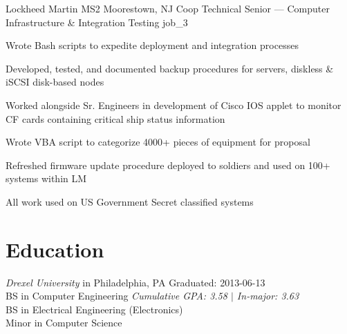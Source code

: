\documentclass[10pt]{barag_resume}
\begin{document}
    \begin{job}{Lockheed Martin MS2}
        {Moorestown, NJ}
        {Coop Technical Senior --- Computer Infrastructure \& Integration Testing}
        {job_3}
            \item Wrote Bash scripts to expedite deployment and integration processes
            \item Developed, tested, and documented backup procedures for servers, diskless \& iSCSI disk-based nodes
            \item Worked alongside Sr. Engineers in development of Cisco IOS applet to monitor CF cards containing critical ship status information
            \item Wrote VBA script to categorize 4000+ pieces of equipment for proposal
            \item Refreshed firmware update procedure deployed to soldiers and used on 100+ systems within LM
            \item All work used on US Government Secret classified systems
    \end{job}


\section{Education}\relax
    {\large\emph{Drexel University}} {\small in Philadelphia, PA} \hfill Graduated: 2013-06-13\\
    BS in Computer Engineering \hfill \emph{Cumulative GPA: 3.58 $|$ In-major: 3.63}\\
    BS in Electrical Engineering (Electronics)\\
    Minor in Computer Science\\
\end{document}
